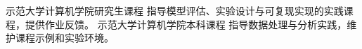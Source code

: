   {示范大学计算机学院}{研究生课程}{
  指导模型评估、实验设计与可复现实现的实践课程，提供作业反馈。
}
  {示范大学计算机学院}{本科课程}{
  指导数据处理与分析实践，维护课程示例和实验环境。
}
